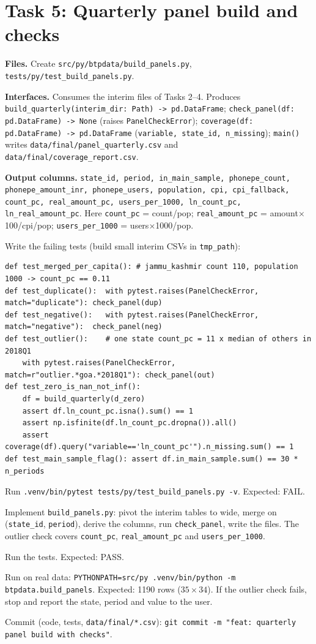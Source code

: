 \documentclass[10pt,a4paper]{article}
\newcommand{\f}[1]{\texttt{#1}}
\begin{document}
\section{Task 5: Quarterly panel build and checks}
\textbf{Files.} Create \f{src/py/btpdata/build\_panels.py}, \f{tests/py/test\_build\_panels.py}.

\textbf{Interfaces.} Consumes the interim files of Tasks 2--4. Produces
\f{build\_quarterly(interim\_dir: Path) -> pd.DataFrame};
\f{check\_panel(df: pd.DataFrame) -> None} (raises \f{PanelCheckError});
\f{coverage(df: pd.DataFrame) -> pd.DataFrame} (\f{variable, state\_id, n\_missing});
\f{main()} writes \f{data/final/panel\_quarterly.csv} and \f{data/final/coverage\_report.csv}.

\textbf{Output columns.} \f{state\_id, period, in\_main\_sample, phonepe\_count, phonepe\_amount\_inr, phonepe\_users,
population, cpi, cpi\_fallback, count\_pc, real\_amount\_pc, users\_per\_1000, ln\_count\_pc, ln\_real\_amount\_pc}.
Here \f{count\_pc} = count/pop; \f{real\_amount\_pc} = amount$\times$100/cpi/pop; \f{users\_per\_1000} = users$\times$1000/pop.

\begin{steps}
\item Write the failing tests (build small interim CSVs in \f{tmp\_path}):
\begin{verbatim}
def test_merged_per_capita(): # jammu_kashmir count 110, population 1000 -> count_pc == 0.11
def test_duplicate():  with pytest.raises(PanelCheckError, match="duplicate"): check_panel(dup)
def test_negative():   with pytest.raises(PanelCheckError, match="negative"):  check_panel(neg)
def test_outlier():    # one state count_pc = 11 x median of others in 2018Q1
    with pytest.raises(PanelCheckError, match=r"outlier.*goa.*2018Q1"): check_panel(out)
def test_zero_is_nan_not_inf():
    df = build_quarterly(d_zero)
    assert df.ln_count_pc.isna().sum() == 1
    assert np.isfinite(df.ln_count_pc.dropna()).all()
    assert coverage(df).query("variable=='ln_count_pc'").n_missing.sum() == 1
def test_main_sample_flag(): assert df.in_main_sample.sum() == 30 * n_periods
\end{verbatim}
\item Run \f{.venv/bin/pytest tests/py/test\_build\_panels.py -v}. Expected: FAIL.
\item Implement \f{build\_panels.py}: pivot the interim tables to wide, merge on (\f{state\_id}, \f{period}),
      derive the columns, run \f{check\_panel}, write the files. The outlier check covers \f{count\_pc},
      \f{real\_amount\_pc} and \f{users\_per\_1000}.
\item Run the tests. Expected: PASS.
\item Run on real data: \f{PYTHONPATH=src/py .venv/bin/python -m btpdata.build\_panels}. Expected: 1190 rows ($35\times34$). If the
      outlier check fails, stop and report the state, period and value to the user.
\item Commit (code, tests, \f{data/final/*.csv}): \f{git commit -m "feat: quarterly panel build with checks"}.
\end{steps}
\end{document}
